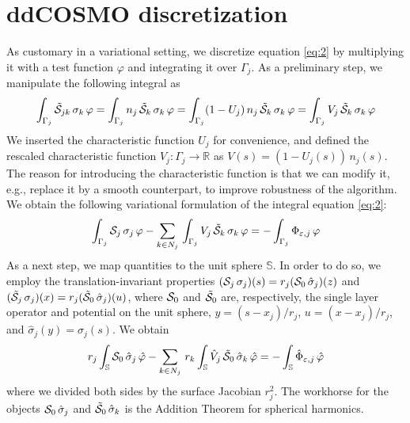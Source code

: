 \section{ddCOSMO discretization \label{app:cosmo}}
As customary in a variational setting, we discretize equation \eqref{eq:2} by multiplying it with a test function $\varphi$ and integrating it over $\Gamma_j$. As a preliminary step, we manipulate the following integral as
\[
\int_{\Gamma_j} \tilde{\mathcal{S}}_{jk} \, \sigma_k \, \varphi =\int_{\Gamma_j} n_j \, \tilde{\mathcal{S}}_{k} \, \sigma_k \, \varphi = \int_{\Gamma_j} (1 - U_j ) \,n_j \, \tilde{\mathcal{S}}_{k} \, \sigma_k \, \varphi = \int_{\Gamma_j} V_j \, \tilde{\mathcal{S}}_{k} \, \sigma_k \, \varphi
\]
We inserted the characteristic function $U_j$ for convenience, and defined the rescaled characteristic function $V_j : \Gamma_j \to \mathbb{R}$ as $V(s) = (1 - U_j(s)) \, n_j(s)$. The reason for introducing the characteristic function is that we can modify it, e.g., replace it by a smooth counterpart, to improve robustness of the algorithm. We obtain the following variational formulation of the integral equation \eqref{eq:2}:
\[
\int_{\Gamma_j} \cS_j \, \sigma_j \, \varphi - \sum_{k \in N_j} \, \int_{\Gamma_j} V_j \, \tilde{\cS}_{k} \, \sigma_k \, \varphi= -\int_{\Gamma_j}  \Phi_{\varepsilon,j} \, \varphi %
\]
As a next step, we map quantities to the unit sphere $\mathbb{S}$. In order to do so, we employ the translation-invariant properties $(\mathcal{S}_j \, \sigma_j)(s) = r_j( \mathcal{S}_0 \, \hat{\sigma}_j)(z)$ and $(\tilde{\mathcal{S}}_j \, \sigma_j)(x) = r_j( \tilde{\mathcal{S}}_0 \, \hat{\sigma}_j)(u)$, where $\mathcal{S}_0$ and $\tilde{\mathcal{S}}_0$ are, respectively, the single layer operator and potential on the unit sphere, $y = (s - x_j)/r_j$, $u = (x - x_j)/r_j$, and $\hat{\sigma}_j(y) = \sigma_j(s)$. We obtain
\begin{equation}\label{eq:50}
r_j \int_{\mathbb{S}} \mathcal{S}_0 \, \hat{\sigma}_j \, \hat{\varphi} - \sum_{k \in N_j} \, r_k  \int_{\mathbb{S}} \hat{V}_j \, \tilde{\mathcal{S}}_0 \, \hat{\sigma}_k \, \hat{\varphi}= -\int_{\mathbb{S}}  \hat{\Phi}_{\varepsilon,j} \, \hat{\varphi}
\end{equation}
where we divided both sides by the surface Jacobian $r_j^2$. The workhorse for the objects $\mathcal{S}_0 \, \hat{\sigma}_j$ and $\tilde{\mathcal{S}}_0 \, \hat{\sigma}_k$ is the Addition Theorem for spherical harmonics.

